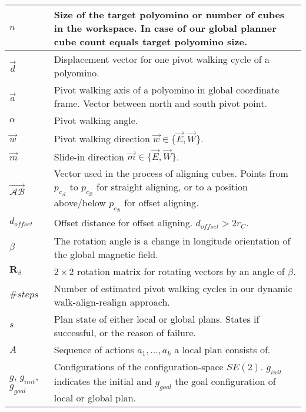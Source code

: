 \begin{xltabular}{\textwidth}{ l  X }
	$n$
	&
	Size of the target polyomino or number of cubes in the workspace.
	In case of our global planner cube count equals target polyomino size.
	\\ \midrule
	
	$\vec{d}$
	&
	Displacement vector for one pivot walking cycle of a polyomino.
	\\ \midrule
	
	$\vec{a}$
	&
	Pivot walking axis of a polyomino in global coordinate frame.
	Vector between north and south pivot point.
	\\ \midrule
	
	$\alpha$
	&
	Pivot walking angle.
	\\ \midrule
	
	$\vec{w}$
	&
	Pivot walking direction $\vec{w} \in \{ \vec{E}, \vec{W} \}$.
	\\ \midrule
	
	$\vec{m}$
	&
	Slide-in direction $\vec{m} \in \{ \vec{E}, \vec{W} \}$.
	\\ \midrule
	
	$\overrightarrow{\mathcal{A}\mathcal{B}}$
	&
	Vector used in the process of aligning cubes.
	Points from $p_{c_\mathcal{A}}$ to $p_{c_\mathcal{B}}$ for straight aligning, or to a position above/below $p_{c_\mathcal{B}}$ for offset aligning.
	\\ \midrule
	
	$d_\textit{offset}$
	&
	Offset distance for offset aligning.
	$d_\textit{offset} > 2 r_C$.
	\\ \midrule
	
	$\beta$  
	&
	The rotation angle is a change in longitude orientation of the global magnetic field.
	\\ \midrule
	
	$\mathbf{R}_\beta$  
	&
	$2 \times 2$ rotation matrix for rotating vectors by an angle of $\beta$.
	\\ \midrule
	
	$\#\textit{steps}$
	&
	Number of estimated pivot walking cycles in our dynamic walk-align-realign approach.
	\\ \midrule
	
	$s$
	&
	Plan state of either local or global plans. States if successful, or the reason of failure.
	\\ \midrule
	
	$A$
	&
	Sequence of actions $a_1, ... , a_k$ a local plan consists of.
	\\ \midrule
		
	$g$, $g_\textit{init}$, $g_\textit{goal}$
	&
	Configurations of the configuration-space $\textit{SE}(2)$. $g_\textit{init}$ indicates the initial and $g_\textit{goal}$ the goal configuration of local or global plan.
	\\ \midrule
	

\end{xltabular}
